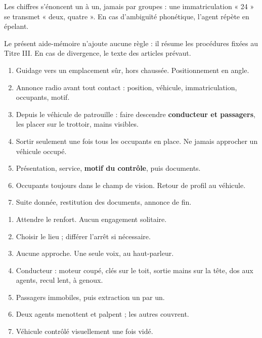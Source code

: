 \vspace{9pt}
\begin{note}[Chiffres]
Les chiffres s'énoncent un à un, jamais par groupes : une immatriculation « 24 » se transmet « deux, quatre ». En cas d'ambiguïté phonétique, l'agent répète en épelant.
\end{note}

\clearpage

Le présent aide-mémoire n'ajoute aucune règle : il résume les procédures fixées au Titre III. En cas de divergence, le texte des articles prévaut.


\begin{enumerate}[leftmargin=13mm]
  \item Guidage vers un emplacement sûr, hors chaussée. Positionnement en angle.
  \item Annonce radio avant tout contact : position, véhicule, immatriculation, occupants, motif.
  \item Depuis le véhicule de patrouille : faire descendre \textbf{conducteur et passagers}, les placer sur le trottoir, mains visibles.
  \item Sortir seulement une fois tous les occupants en place. Ne jamais approcher un véhicule occupé.
  \item Présentation, service, \textbf{motif du contrôle}, puis documents.
  \item Occupants toujours dans le champ de vision. Retour de profil au véhicule.
  \item Suite donnée, restitution des documents, annonce de fin.
\end{enumerate}


\begin{enumerate}[leftmargin=13mm]
  \item Attendre le renfort. Aucun engagement solitaire.
  \item Choisir le lieu ; différer l'arrêt si nécessaire.
  \item Aucune approche. Une seule voix, au haut-parleur.
  \item Conducteur : moteur coupé, clés sur le toit, sortie mains sur la tête, dos aux agents, recul lent, à genoux.
  \item Passagers immobiles, puis extraction un par un.
  \item Deux agents menottent et palpent ; les autres couvrent.
  \item Véhicule contrôlé visuellement une fois vidé.
\end{enumerate}

